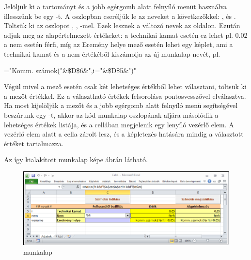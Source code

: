 Jelöljük ki a  tartományt és a jobb egérgomb alatt
felnyíló menüt használva 
illesszünk be egy -t. A  oszlopban cseréljük
le az  neveket a következőkkel: ,
 és . Töltsük ki az  oszlopot , , -mel. Ezek lesznek a
változó nevek az  oldalon. 
Ezután adjuk meg az alapértelmezett értékeket: a technikai kamat
esetén ez lehet pl. 0.02 a nem esetén férfi, míg az Eremény helye mező
esetén lehet egy képlet, ami a technikai 
kamat és a nem értékéből kiszámolja az új munkalap nevét, pl.
\begin{VBAframe}
="Komm. számok("\&\$D\$6\&",i="\&\$D\$5\&")"
\end{VBAframe}
Végül mivel a  mező esetén csak két lehetséges értékből
lehet választani, töltsük ki a  mezőt  értékkel. Ez a választható értékek felsorolása pontosvesszővel elválasztva. Ha most kijelöljük a  mezőt és a jobb egérgomb alatt felnyíló menü segítségével 
beszúrunk egy -t, akkor az  kód
munkalap  oszlopának aljára másolódik a lehetséges értékek
listája, és a  cellában megjelenik egy lenyíló vezérlő
elem. A vezérlő elem alatt a  cella zárolt lesz, és a
képletezés hatására mindig a választott értéket 
tartalmazza.

Az így kialakított munkalap képe  ábrán látható. 
\begin{figure}[h]
  \centering
  \includegraphics{images/adatok}
  \caption{ munkalap}
  \label{fig:1.2}
\end{figure}

